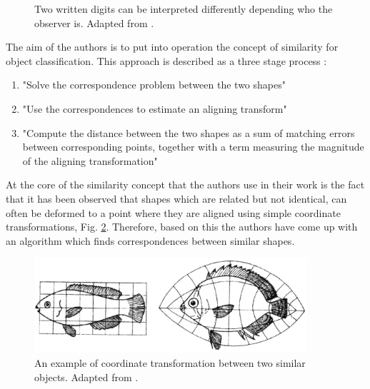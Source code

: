 \begin{figure}[h]
        \centering
        \caption[An example of similarity]{Two written digits can be interpreted differently depending who the observer is. Adapted from \cite{context}.}
        \label{fig:similarity}
\end{figure}

The aim of the authors is to put into operation the concept of similarity for object classification. This approach is described as a three stage process \cite{context}:

\begin{enumerate}
    \item "Solve the correspondence problem between the two shapes"
    \item "Use the correspondences to estimate an aligning transform"
    \item "Compute the distance between the two shapes as a sum of matching errors between corresponding points, together with a term measuring the magnitude of the aligning transformation"
\end{enumerate}

At the core of the similarity concept that the authors use in their work is the fact that it has been observed that shapes which are related but not identical, can often be deformed to a point where they are aligned using simple coordinate transformations, Fig. \ref{fig:fish}. Therefore, based on this the authors have come up with an algorithm which finds correspondences between similar shapes. \\

\begin{figure}[h]
        \centering
        \includegraphics[width=0.9\textwidth]{figures/LitreatureReview/fish.png}
        \caption[An example of simple coordinate transformations between similar objects]{An example of coordinate transformation between two similar objects. Adapted from \cite{context}.}
        \label{fig:fish}
\end{figure}

